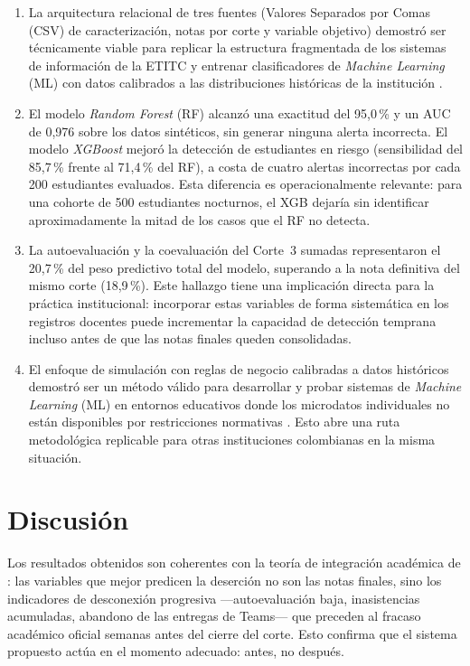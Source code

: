 \documentclass[12pt,letterpaper]{article}
\newcommand{\ML}{\textit{Machine Learning} (ML)\xspace}
\newcommand{\RF}{\textit{Random Forest} (RF)\xspace}
\newcommand{\XGB}{\textit{XGBoost}\xspace}
\newcommand{\CSV}{Valores Separados por Comas (CSV)\xspace}
\begin{document}
\begin{enumerate}
  \item La arquitectura relacional de tres fuentes (\CSV de caracterización, notas por corte y variable objetivo) demostró ser técnicamente viable para replicar la estructura fragmentada de los sistemas de información de la ETITC y entrenar clasificadores de \ML con datos calibrados a las distribuciones históricas de la institución \parencite{etitc_bienestar}.

  \item El modelo \RF alcanzó una exactitud del 95,0\,\% y un AUC de 0,976 sobre los datos sintéticos, sin generar ninguna alerta incorrecta. El modelo \XGB mejoró la detección de estudiantes en riesgo (sensibilidad del 85,7\,\% frente al 71,4\,\% del RF), a costa de cuatro alertas incorrectas por cada 200 estudiantes evaluados. Esta diferencia es operacionalmente relevante: para una cohorte de 500 estudiantes nocturnos, el XGB dejaría sin identificar aproximadamente la mitad de los casos que el RF no detecta.

  \item La autoevaluación y la coevaluación del Corte~3 sumadas representaron el 20,7\,\% del peso predictivo total del modelo, superando a la nota definitiva del mismo corte (18,9\,\%). Este hallazgo tiene una implicación directa para la práctica institucional: incorporar estas variables de forma sistemática en los registros docentes puede incrementar la capacidad de detección temprana incluso antes de que las notas finales queden consolidadas.

  \item El enfoque de simulación con reglas de negocio calibradas a datos históricos demostró ser un método válido para desarrollar y probar sistemas de \ML en entornos educativos donde los microdatos individuales no están disponibles por restricciones normativas \parencite{ley1581}. Esto abre una ruta metodológica replicable para otras instituciones colombianas en la misma situación.
\end{enumerate}

\section{Discusión}

Los resultados obtenidos son coherentes con la teoría de integración académica de \textcite{tinto1975}: las variables que mejor predicen la deserción no son las notas finales, sino los indicadores de desconexión progresiva —autoevaluación baja, inasistencias acumuladas, abandono de las entregas de Teams— que preceden al fracaso académico oficial semanas antes del cierre del corte. Esto confirma que el sistema propuesto actúa en el momento adecuado: antes, no después.
\end{document}
